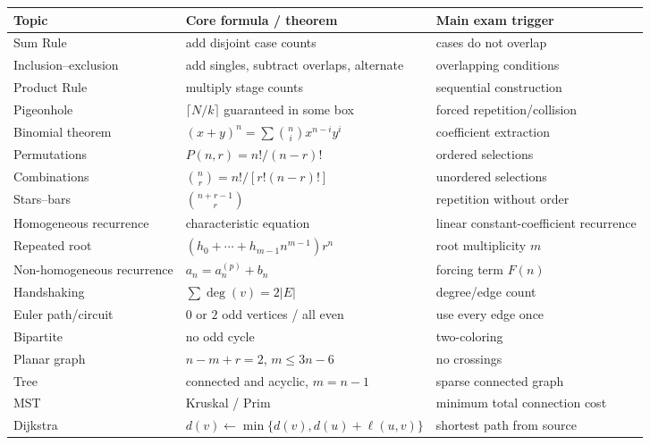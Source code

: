 \begin{center}
\small
\begin{tabular}{@{}p{}p{}p{}@{}}
\toprule
\textbf{Topic} & \textbf{Core formula / theorem} & \textbf{Main exam trigger} \\
\midrule
Sum Rule & add disjoint case counts & cases do not overlap \\
Inclusion--exclusion & add singles, subtract overlaps, alternate & overlapping conditions \\
Product Rule & multiply stage counts & sequential construction \\
Pigeonhole & \(\lceil N/k\rceil\) guaranteed in some box & forced repetition/collision \\
Binomial theorem & \((x+y)^n=\sum\binom{n}{i}x^{n-i}y^i\) & coefficient extraction \\
Permutations & \(P(n,r)=n!/(n-r)!\) & ordered selections \\
Combinations & \(\binom{n}{r}=n!/[r!(n-r)!]\) & unordered selections \\
Stars--bars & \(\binom{n+r-1}{r}\) & repetition without order \\
Homogeneous recurrence & characteristic equation & linear constant-coefficient recurrence \\
Repeated root & \((h_0+\cdots+h_{m-1}n^{m-1})r^n\) & root multiplicity \(m\) \\
Non-homogeneous recurrence & \(a_n=a_n^{(p)}+b_n\) & forcing term \(F(n)\) \\
Handshaking & \(\sum\deg(v)=2|E|\) & degree/edge count \\
Euler path/circuit & \(0\) or \(2\) odd vertices / all even & use every edge once \\
Bipartite & no odd cycle & two-coloring \\
Planar graph & \(n-m+r=2\), \(m\le 3n-6\) & no crossings \\
Tree & connected and acyclic, \(m=n-1\) & sparse connected graph \\
MST & Kruskal / Prim & minimum total connection cost \\
Dijkstra & \(d(v)\leftarrow\min\{d(v),d(u)+\ell(u,v)\}\) & shortest path from source \\
\bottomrule
\end{tabular}
\end{center}

